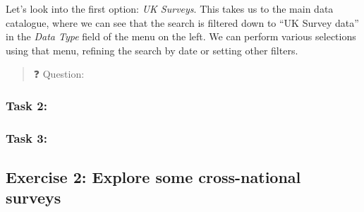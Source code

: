 \documentclass[
]{article}
\begin{document}
Let's look into the first option: \emph{UK Surveys}. This takes us to
the main data catalogue, where we can see that the search is filtered
down to ``UK Survey data'' in the \emph{Data Type} field of the menu on
the left. We can perform various selections using that menu, refining
the search by date or setting other filters.

\begin{quote}
❓ Question:
\end{quote}

\hypertarget{task-2}{%
\subsubsection{Task 2:}\label{task-2}}

\hypertarget{task-3}{%
\subsubsection{Task 3:}\label{task-3}}

\hypertarget{exercise-2-explore-some-cross-national-surveys}{%
\subsection{Exercise 2: Explore some cross-national
surveys}\label{exercise-2-explore-some-cross-national-surveys}}
\end{document}
